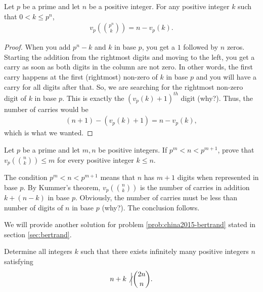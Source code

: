 \documentclass[12pt]{subfile}
\begin{document}
\begin{corollary}\label{cor:kummer-corollary}
	Let $p$ be a prime and let $n$ be a positive integer. For any positive integer $k$ such that $0<k\leq p^n$,
	\begin{align*}
	v_p\left( \binom{p^n}{k}\right)	= n - v_p(k).
	\end{align*}
\end{corollary}

\begin{proof}
	When you add $p^n - k$ and $k$ in base $p$, you get a $1$ followed by $n$ zeros. Starting the addition from the rightmost digits and moving to the left, you get a carry as soon as both digits in the column are not zero. In other words, the first carry happens at the first (rightmost) non-zero of $k$ in base $p$ and you will have a carry for all digits after that. So, we are searching for the rightmost non-zero digit of $k$ in base $p$. This is exactly the $(v_p(k)+1)^{th}$ digit (why?). Thus, the number of carries would be
	\begin{align*}
	(n+1)-(v_p(k)+1) = n-v_p(k),
	\end{align*}
	which is what we wanted.
\end{proof}
\begin{problem}
	Let $p$ be a prime and let $m,n$ be positive integers. If $p^m < n < p^{m+1}$, prove that $v_p\left(\binom{n}{k}\right) \leq m$ for every positive integer $k\leq n$.
\end{problem}

\begin{solution}
	The condition $p^m < n < p^{m+1}$ means that $n$ has $m+1$ digits when represented in base $p$. By Kummer's theorem, $v_p\left(\binom{n}{k}\right)$ is the number of carries in addition $k+(n-k)$ in base $p$. Obviously, the number of carries must be less than number of digits of $n$ in base $p$ (why?). The conclusion follows.
\end{solution}
We will provide another solution for problem \eqref{prob:china2015-bertrand} stated in section \eqref{sec:bertrand}.

\begin{problem}[China 2015]
	Determine all integers $k$ such that there exists infinitely many positive integers $n$ satisfying
	\begin{align*}
	n+k \not \Big| \binom{2n}{n}.
	\end{align*}
\end{problem}
\end{document}
